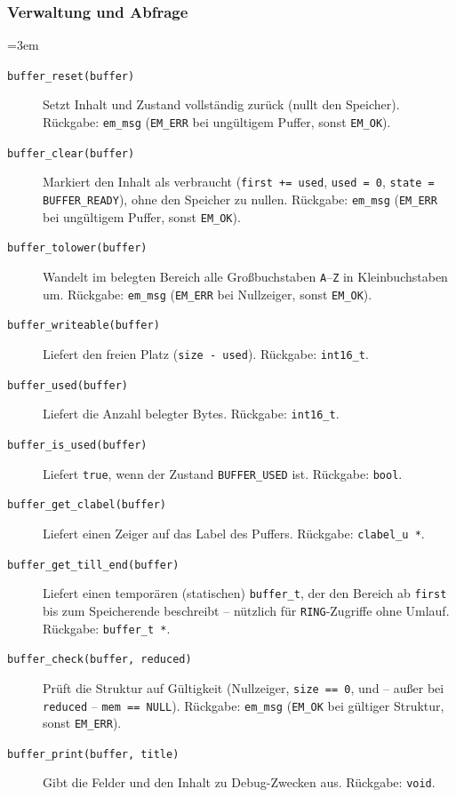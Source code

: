 \subsubsection*{Verwaltung und Abfrage}
{\sloppy\emergencystretch=3em
\begin{description}
\item[\texttt{buffer\_reset(buffer)}] Setzt Inhalt und Zustand vollständig
  zurück (nullt den Speicher). Rückgabe: \verb|em_msg| (\verb|EM_ERR| bei
  ungültigem Puffer, sonst \verb|EM_OK|).
\item[\texttt{buffer\_clear(buffer)}] Markiert den Inhalt als verbraucht
  (\verb|first += used|, \verb|used = 0|, \verb|state = BUFFER_READY|), ohne
  den Speicher zu nullen. Rückgabe: \verb|em_msg| (\verb|EM_ERR| bei
  ungültigem Puffer, sonst \verb|EM_OK|).
\item[\texttt{buffer\_tolower(buffer)}] Wandelt im belegten Bereich alle
  Großbuchstaben \texttt{A}--\texttt{Z} in Kleinbuchstaben um. Rückgabe:
  \verb|em_msg| (\verb|EM_ERR| bei Nullzeiger, sonst \verb|EM_OK|).
\item[\texttt{buffer\_writeable(buffer)}] Liefert den freien Platz
  (\verb|size - used|). Rückgabe: \verb|int16_t|.
\item[\texttt{buffer\_used(buffer)}] Liefert die Anzahl belegter Bytes.
  Rückgabe: \verb|int16_t|.
\item[\texttt{buffer\_is\_used(buffer)}] Liefert \verb|true|, wenn der Zustand
  \verb|BUFFER_USED| ist. Rückgabe: \verb|bool|.
\item[\texttt{buffer\_get\_clabel(buffer)}] Liefert einen Zeiger auf das Label
  des Puffers. Rückgabe: \verb|clabel_u *|.
\item[\texttt{buffer\_get\_till\_end(buffer)}] Liefert einen temporären
  (statischen) \verb|buffer_t|, der den Bereich ab \verb|first| bis zum
  Speicherende beschreibt -- nützlich für \verb|RING|-Zugriffe ohne Umlauf.
  Rückgabe: \verb|buffer_t *|.
\item[\texttt{buffer\_check(buffer, reduced)}] Prüft die Struktur auf
  Gültigkeit (Nullzeiger, \verb|size == 0|, und -- außer bei \verb|reduced| --
  \verb|mem == NULL|). Rückgabe: \verb|em_msg| (\verb|EM_OK| bei gültiger
  Struktur, sonst \verb|EM_ERR|).
\item[\texttt{buffer\_print(buffer, title)}] Gibt die Felder und den Inhalt zu
  Debug-Zwecken aus. Rückgabe: \verb|void|.
\end{description}
\par}
